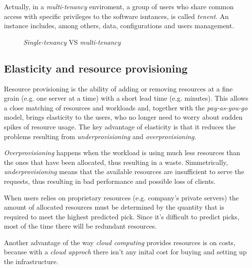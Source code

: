 Actually, in a \emph{multi-tenancy} enviroment, a group of users who share
common access with specific privileges to the software isntances, is called
\emph{tenent}. An instance includes, among others, data, configurations and
users management.

\newpage
\begin{figure}[ht!]
    \centering
    \hspace{2mm}
    \hspace{2mm}
    \caption{\emph{Single-tenancy} VS \emph{multi-tenancy}}
\end{figure}

\subsection{Elasticity and resource provisioning}
Resource provisioning is the ability of adding or removing resources at a fine
grain (e.g. one server at a time) with a short lead time (e.g. minutes). This
allows a close matching of resources and workloads and, together with the
\emph{pay-as-you-go} model, brings elasticity to the users, who no longer need
to worry about sudden spikes of resource usage. The key advantage of elasticity
is that it reduces the problems resulting from \emph{underprovisioning} and
\emph{overprovisioning}.

\emph{Overprovisioning} happens when the workload is using much less resources
than the ones that have been allocated, thus resulting in a waste.
Simmetrically, \emph{underprovisioning} means that the available resources are
insufficient to serve the requests, thus resulting in bad performance and
possible loss of clients.

When users relies on proprietary resources (e.g. company's private servers) the
amount of allocated resources must be determined by the quantity that is
required to meet the highest predicted pick. Since it's difficult to predict
picks, most of the time there will be redundant resources.

Another advantage of the way \emph{cloud computing} provides resources is on costs,
because with a \emph{cloud approch} there isn't any inital cost for buying and
setting up the infrastructure.

